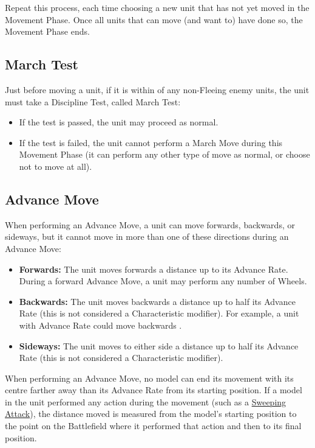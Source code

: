Repeat this process, each time choosing a new unit that has not yet moved in the Movement Phase. Once all units that can move (and want to) have done so, the Movement Phase ends.

\subsection{March Test}
\label{march_test}

Just before moving a unit, if it is within  of any non-Fleeing enemy units, the unit must take a Discipline Test, called March Test:
\begin{itemize}
\item If the test is passed, the unit may proceed as normal.
\item If the test is failed, the unit cannot perform a March Move during this Movement Phase (it can perform any other type of move as normal, or choose not to move at all).
\end{itemize}

\subsection{Advance Move}
\label{advance_move}

When performing an Advance Move, a unit can move forwards, backwards, or sideways, but it cannot move in more than one of these directions during an Advance Move:

\begin{itemize}
\item\textbf{Forwards:} The unit moves forwards a distance up to its Advance Rate. During a forward Advance Move, a unit may perform any number of Wheels.
\item\textbf{Backwards:} The unit moves backwards a distance up to half its Advance Rate (this is not considered a Characteristic modifier). For example, a unit with Advance Rate  could move backwards .
\item\textbf{Sideways:} The unit moves to either side a distance up to half its Advance Rate (this is not considered a Characteristic modifier).
\end{itemize}

When performing an Advance Move, no model can end its movement with its centre farther away than its Advance Rate from its starting position. If a model in the unit performed any action during the movement (such as a \hyperref[sweeping_attack]{Sweeping Attack}), the distance moved is measured from the model's starting position to the point on the Battlefield where it performed that action and then to its final position.

